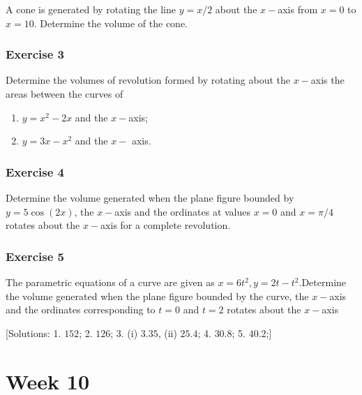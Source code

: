 \documentclass[
  english,
  11pt,
  oneside]{book}
\providecommand{\tightlist}{%
  \setlength{\itemsep}{0pt}\setlength{\parskip}{0pt}}
\newcommand{\slide}{}
\theoremstyle{definition}
\theoremstyle{definition}
\theoremstyle{definition}
\theoremstyle{definition}
\theoremstyle{remark}
\begin{document}
A cone is generated by rotating the line \(y = x/2\) about the \(x-\)axis from \(x = 0\) to \(x = 10\). Determine the volume of the cone.

\slide

\subsection*{Exercise 3}\label{exercise-3-8}

Determine the volumes of revolution formed by rotating about the \(x-\)axis the areas between the curves of

\begin{enumerate}
\def\labelenumi{\roman{enumi}.}
\tightlist
\item
  \(y = x^2 - 2x\) and the \(x-\)axis;
\item
  \(y = 3x - x^2\) and the \(x-\) axis.
\end{enumerate}

\slide

\subsection*{Exercise 4}\label{exercise-4-6}

Determine the volume generated when the plane figure bounded by \(y = 5\cos(2x)\), the \(x-\)axis and the ordinates at values \(x = 0\) and \(x = \pi/4\) rotates about the \(x-\)axis for a complete revolution.

\slide

\subsection*{Exercise 5}\label{exercise-5-5}

The parametric equations of a curve are given as \(x = 6t^2, y = 2t - t^2\).Determine the volume generated when the plane figure bounded by the curve, the \(x-\)axis and the ordinates corresponding to \(t = 0\) and \(t = 2\) rotates about the \(x-\)axis

{[}Solutions:
1. \(152\);
2. \(126\);
3. (i) \(3.35\), (ii) \(25.4\);
4. \(30.8\);
5. \(40.2\);{]}

\chapter{Week 10}\label{week-ten}
\end{document}
